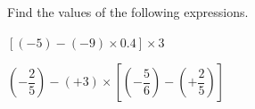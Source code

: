  Find the values of the following expressions.

\begin{subparts}
  \item $[(-5)-(-9)\times 0.4]\times 3$

  \item $\left(-\dfrac{2}{5}\right)-(+3)\times\left[\left(-\dfrac{5}{6}\right)-\left(+\dfrac{2}{5}\right)\right]$
\end{subparts}

